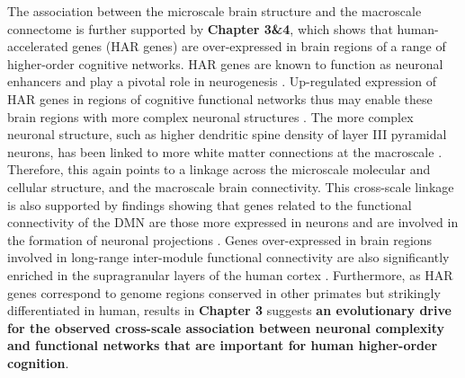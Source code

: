 \begin{refsection}
The association between the microscale brain structure and the macroscale connectome is further supported by \textbf{Chapter 3\&4}, which shows that human-accelerated genes (HAR genes) are over-expressed in brain regions of a range of higher-order cognitive networks. HAR genes are known to function as neuronal enhancers and play a pivotal role in neurogenesis \citep{Ryu256313}. Up-regulated expression of HAR genes in regions of cognitive functional networks thus may enable these brain regions with more complex neuronal structures \citep{elston2003cortex}. The more complex neuronal structure, such as higher dendritic spine density of layer III pyramidal neurons, has been linked to more white matter connections at the macroscale \citep{scholtens2014linking,VANDENHEUVEL2016293}. Therefore, this again points to a linkage across the microscale molecular and cellular structure, and the macroscale brain connectivity. This cross-scale linkage is also supported by findings showing that genes related to the functional connectivity of the DMN are those more expressed in neurons \citep{wang2015correspondence} and are involved in the formation of neuronal projections \citep{Wei2019GeneticMA}. Genes over-expressed in brain regions involved in long-range inter-module functional connectivity are also significantly enriched in the supragranular layers of the human cortex \citep{vertes2016gene}. Furthermore, as HAR genes correspond to genome regions conserved in other primates but strikingly differentiated in human, results in \textbf{Chapter 3} suggests \textbf{an evolutionary drive for the observed cross-scale association between neuronal complexity and functional networks that are important for human higher-order cognition}.


\end{refsection}
